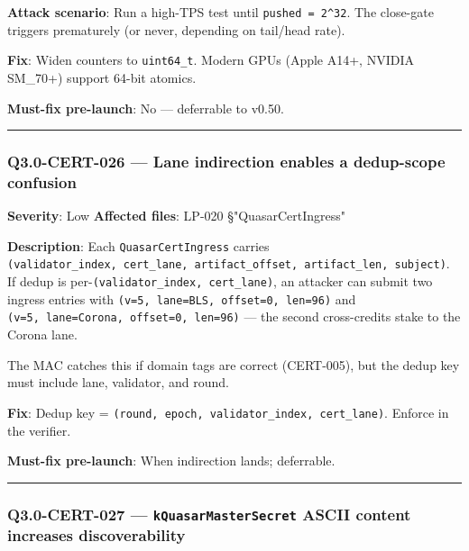 \documentclass[
]{article}
\begin{document}
\textbf{Attack scenario}: Run a high-TPS test until
\texttt{pushed\ =\ 2\^{}32}. The close-gate triggers prematurely (or
never, depending on tail/head rate).

\textbf{Fix}: Widen counters to \texttt{uint64\_t}. Modern GPUs (Apple
A14+, NVIDIA SM\_70+) support 64-bit atomics.

\textbf{Must-fix pre-launch}: No --- deferrable to v0.50.

\begin{center}\rule{0.5\linewidth}{0.5pt}\end{center}

\subsubsection{Q3.0-CERT-026 --- Lane indirection enables a dedup-scope
confusion}\label{q30-cert-026--lane-indirection-enables-a-dedup-scope-confusion}

\textbf{Severity}: Low \textbf{Affected files}: LP-020
§"QuasarCertIngress"

\textbf{Description}: Each \texttt{QuasarCertIngress} carries
\texttt{(validator\_index,\ cert\_lane,\ artifact\_offset,\ artifact\_len,\ subject)}.
If dedup is per-\texttt{(validator\_index,\ cert\_lane)}, an attacker
can submit two ingress entries with
\texttt{(v=5,\ lane=BLS,\ offset=0,\ len=96)} and
\texttt{(v=5,\ lane=Corona,\ offset=0,\ len=96)} --- the second
cross-credits stake to the Corona lane.

The MAC catches this if domain tags are correct (CERT-005), but the
dedup key must include lane, validator, and round.

\textbf{Fix}: Dedup key =
\texttt{(round,\ epoch,\ validator\_index,\ cert\_lane)}. Enforce in the
verifier.

\textbf{Must-fix pre-launch}: When indirection lands; deferrable.

\begin{center}\rule{0.5\linewidth}{0.5pt}\end{center}

\subsubsection{\texorpdfstring{Q3.0-CERT-027 ---
\texttt{kQuasarMasterSecret} ASCII content increases
discoverability}{Q3.0-CERT-027 --- kQuasarMasterSecret ASCII content increases discoverability}}\label{q30-cert-027--kquasarmastersecret-ascii-content-increases-discoverability}
\end{document}

